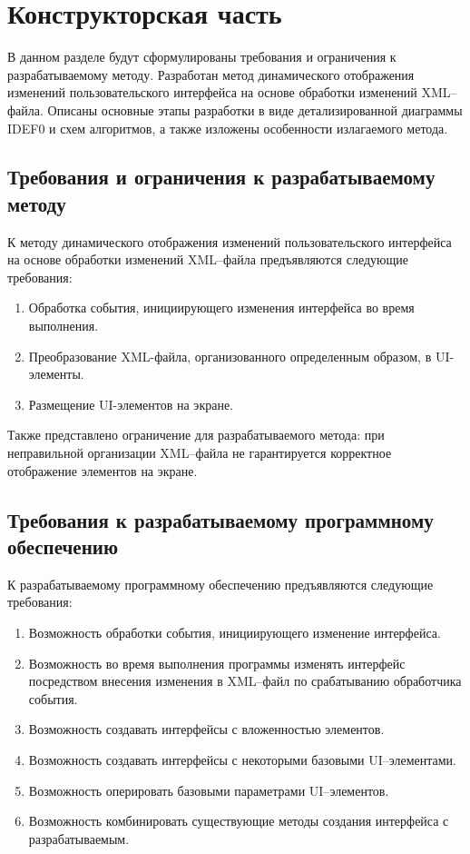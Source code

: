\section{Конструкторская часть}

В данном разделе будут сформулированы требования и ограничения к разрабатываемому методу. 
Разработан метод динамического отображения изменений пользовательского интерфейса на основе обработки изменений XML--файла.
Описаны основные этапы разработки в виде детализированной диаграммы IDEF0 и схем алгоритмов, а также изложены особенности излагаемого метода. 

\subsection{Требования и ограничения к разрабатываемому методу}

К методу динамического отображения изменений пользовательского интерфейса на основе обработки изменений XML--файла предъявляются следующие требования:
\begin{enumerate}
	\item Обработка события, инициирующего изменения интерфейса во время выполнения.
	\item Преобразование XML-файла, организованного определенным образом, в UI-элементы.
	\item Размещение UI-элементов на экране.
\end{enumerate}
	
Также представлено ограничение для разрабатываемого метода: при неправильной организации XML--файла не гарантируется корректное отображение элементов на экране.




\subsection{Требования к разрабатываемому программному обеспечению}

К разрабатываемому программному обеспечению предъявляются следующие требования:
\begin{enumerate}
	\item Возможность обработки события, инициирующего изменение интерфейса.
	\item Возможность во время выполнения программы изменять интерфейс посредством внесения изменения в XML--файл по срабатыванию обработчика события.
	\item Возможность создавать интерфейсы с вложенностью элементов.
	\item Возможность создавать интерфейсы с некоторыми базовыми UI--элементами.
	\item Возможность оперировать базовыми параметрами UI--элементов.
	\item Возможность комбинировать существующие методы создания интерфейса с разрабатываемым.
\end{enumerate}

